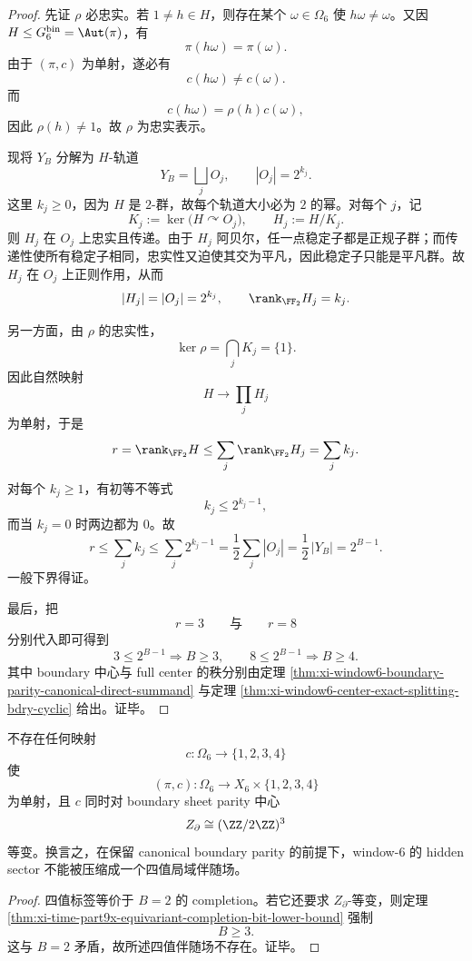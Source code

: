 \begin{proof}
先证 \(\rho\) 必忠实。若 \(1\neq h\in H\)，则存在某个 \(\omega\in \Omega_6\) 使 \(h\omega\neq \omega\)。又因 \(H\le G_6^{\mathrm{bin}}=\Aut(\pi)\)，有
\[
\pi(h\omega)=\pi(\omega).
\]
由于 \((\pi,c)\) 为单射，遂必有
\[
c(h\omega)\neq c(\omega).
\]
而
\[
c(h\omega)=\rho(h)c(\omega),
\]
因此 \(\rho(h)\neq 1\)。故 \(\rho\) 为忠实表示。

现将 \(Y_B\) 分解为 \(H\)-轨道
\[
Y_B=\bigsqcup_j O_j,
\qquad
|O_j|=2^{k_j}.
\]
这里 \(k_j\ge 0\)，因为 \(H\) 是 \(2\)-群，故每个轨道大小必为 \(2\) 的幂。对每个 \(j\)，记
\[
K_j:=\ker\bigl(H\curvearrowright O_j\bigr),
\qquad
H_j:=H/K_j.
\]
则 \(H_j\) 在 \(O_j\) 上忠实且传递。由于 \(H_j\) 阿贝尔，任一点稳定子都是正规子群；而传递性使所有稳定子相同，忠实性又迫使其交为平凡，因此稳定子只能是平凡群。故 \(H_j\) 在 \(O_j\) 上正则作用，从而
\[
|H_j|=|O_j|=2^{k_j},
\qquad
\rank_{\FF_2}H_j=k_j.
\]

另一方面，由 \(\rho\) 的忠实性，
\[
\ker \rho=\bigcap_j K_j=\{1\}.
\]
因此自然映射
\[
H\longrightarrow \prod_j H_j
\]
为单射，于是
\[
r=\rank_{\FF_2}H\le \sum_j \rank_{\FF_2}H_j=\sum_j k_j.
\]
对每个 \(k_j\ge 1\)，有初等不等式
\[
k_j\le 2^{k_j-1},
\]
而当 \(k_j=0\) 时两边都为 \(0\)。故
\[
r\le \sum_j k_j\le \sum_j 2^{k_j-1}
=
\frac12\sum_j |O_j|
=
\frac12\,|Y_B|
=
2^{B-1}.
\]
一般下界得证。

最后，把
\[
r=3
\qquad\text{与}\qquad
r=8
\]
分别代入即可得到
\[
3\le 2^{B-1}\Longrightarrow B\ge 3,
\qquad
8\le 2^{B-1}\Longrightarrow B\ge 4.
\]
其中 boundary 中心与 full center 的秩分别由定理
\ref{thm:xi-window6-boundary-parity-canonical-direct-summand} 与定理
\ref{thm:xi-window6-center-exact-splitting-bdry-cyclic} 给出。证毕。
\end{proof}

\begin{corollary}\label{cor:xi-time-part9x-no-boundary-equivariant-four-valued-companion-field}
不存在任何映射
\[
c:\Omega_6\to \{1,2,3,4\}
\]
使
\[
(\pi,c):\Omega_6\to X_6\times \{1,2,3,4\}
\]
为单射，且 \(c\) 同时对 boundary sheet parity 中心
\[
Z_{\partial}\cong (\ZZ/2\ZZ)^3
\]
等变。换言之，在保留 canonical boundary parity 的前提下，window-\(6\) 的 hidden sector 不能被压缩成一个四值局域伴随场。
\end{corollary}
\begin{proof}
四值标签等价于 \(B=2\) 的 completion。若它还要求 \(Z_{\partial}\)-等变，则定理
\ref{thm:xi-time-part9x-equivariant-completion-bit-lower-bound} 强制
\[
B\ge 3.
\]
这与 \(B=2\) 矛盾，故所述四值伴随场不存在。证毕。
\end{proof}

